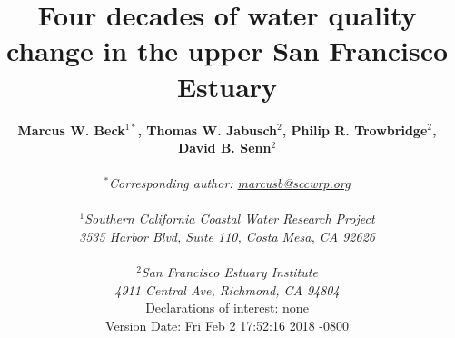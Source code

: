\documentclass[letterpaper,12pt,oneside]{article}\usepackage[]{graphicx}\usepackage[]{color}
\begin{document}
\raggedbottom
\linenumbers
\raggedright
{}
\setlength{\parindent}{0.5in}
\renewcommand\refname{References \vspace{12pt}}

\begin{singlespace}
\title{{\bf {\Large Four decades of water quality change in the upper San Francisco Estuary}}}
\author{
  {\bf {\normalsize Marcus W. Beck$^{1*}$, Thomas W. Jabusch$^2$, Philip R. Trowbridge$^2$, David B. Senn$^2$}}
  \\\\{\textit {\normalsize $^*$Corresponding author: \href{mailto:marcusb@sccwrp.org}{marcusb@sccwrp.org}}}
  \\\\{\textit {\normalsize $^1$Southern California Coastal Water Research Project}}
  \\{\textit {\normalsize 3535 Harbor Blvd, Suite 110, Costa Mesa, CA 92626}}
  \\\\{\textit {\normalsize $^2$San Francisco Estuary Institute}}
	\\{\textit {\normalsize 4911 Central Ave, Richmond, CA 94804}}
  \vspace{1in}
  \\{Declarations of interest: none}
  \vspace{0.1in}
  \\ Version Date:   Fri Feb 2 17:52:16 2018 -0800
	}
\date{}
\maketitle
\end{singlespace}
\clearpage
\end{document}
